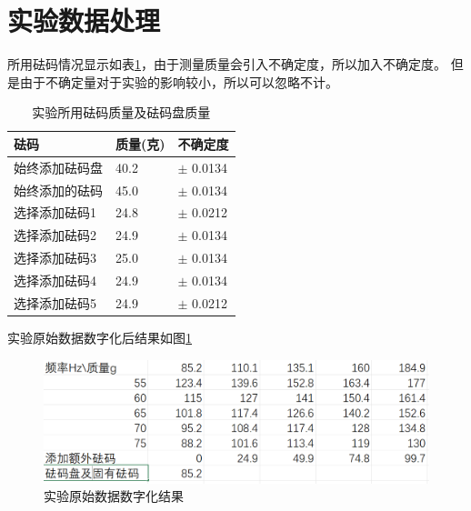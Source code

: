 \documentclass{ctexart}
\begin{document}
\section{实验数据处理}
所用砝码情况显示如表\ref{famazhiliang}，由于测量质量会引入不确定度，所以加入不确定度。
但是由于不确定量对于实验的影响较小，所以可以忽略不计。
\begin{table}[h]
  \centering   
  \caption{实验所用砝码质量及砝码盘质量}\label{famazhiliang}
  \begin{tabular}{| l || l || l |}
      \hline
      砝码 & 质量(克) & 不确定度\\
      \hline
      始终添加砝码盘 & 40.2 & $\pm$ 0.0134\\
      \hline
      始终添加的砝码 & 45.0 & $\pm$ 0.0134\\
      \hline
      选择添加砝码1 & 24.8 & $\pm$ 0.0212\\
      \hline
      选择添加砝码2 & 24.9 & $\pm$ 0.0134\\
      \hline
      选择添加砝码3 & 25.0 & $\pm$ 0.0134\\
      \hline
      选择添加砝码4 & 24.9 & $\pm$ 0.0134\\
      \hline
      选择添加砝码5 & 24.9 & $\pm$ 0.0212\\
      \hline                       
  \end{tabular}
\end{table}

实验原始数据数字化后结果如图\ref{shiyanshujvexl}
\begin{figure}[h]
  \centering
  \includegraphics[width=1\textwidth]{shiyanshujvexl.png}
  \caption{实验原始数据数字化结果}\label{shiyanshujvexl}
\end{figure}
\end{document}
